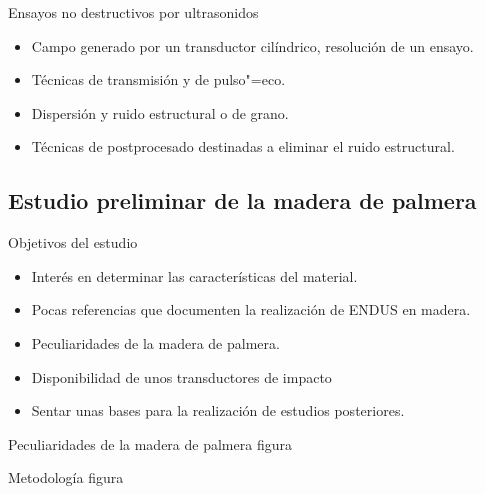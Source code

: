 \documentclass[utf8, compress]			{beamer}
\begin{document}
\begin{frame}{Ensayos no destructivos por ultrasonidos}
    \begin{itemize}
	\item Campo generado por un transductor cilíndrico, resolución de
	    un ensayo.
	\item Técnicas de transmisión y de pulso"=eco.
	\item Dispersión y ruido estructural o de grano.
	\item Técnicas de postprocesado destinadas a eliminar el ruido
	    estructural.
    \end{itemize}
\end{frame}


\subsection{Estudio preliminar de la madera de palmera}

\begin{frame}{Objetivos del estudio}
    \begin{itemize}
	\item Interés en determinar las características del material.
	\item Pocas referencias que documenten la realización de ENDUS en
	    madera.
	\item Peculiaridades de la madera de palmera.
	\item Disponibilidad de unos transductores de impacto
	\item \alert{Sentar unas bases para la realización de estudios
	    posteriores.}
    \end{itemize}
\end{frame}

\begin{frame}{Peculiaridades de la madera de palmera}
    \alert{figura}
\end{frame}

\begin{frame}{Metodología}
    \alert{figura} 
\end{frame}
\end{document}

